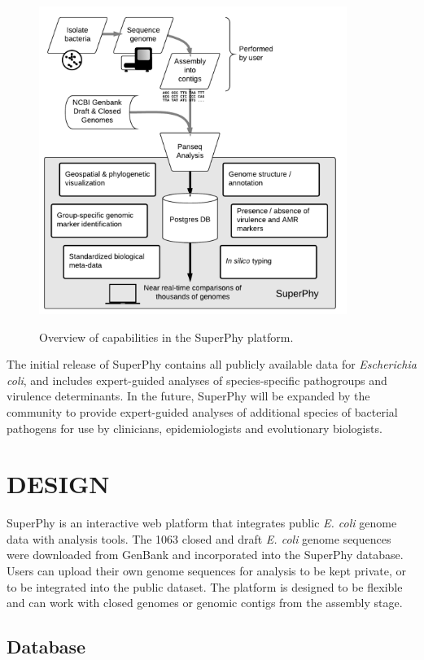 \documentclass[a4paper,twoside]{article}
\begin{document}
\begin{figure}[t]
  \centering
   {\includegraphics[width=10cm]{capabilities.pdf}}
  \caption{Overview of capabilities in the SuperPhy platform.}
  \label{fig:capabilities}
\end{figure}

The initial release of SuperPhy contains all publicly available data for \textit{Escherichia coli}, and includes expert-guided analyses of species-specific pathogroups and virulence determinants. In the future, SuperPhy will be expanded by the community to provide expert-guided analyses of additional species of bacterial pathogens for use by clinicians, epidemiologists and evolutionary biologists.

\section{\uppercase{Design}}
\label{sec:design}

\noindent SuperPhy is an interactive web platform that integrates public \textit{E. coli} genome data with analysis tools. The 1063 closed and draft \textit{E. coli} genome sequences were downloaded from GenBank and incorporated into the SuperPhy database. Users can upload their own genome sequences for analysis to be kept private, or to be integrated into the public dataset. The platform is designed to be flexible and can work with closed genomes or genomic contigs from the assembly stage. 

\subsection{Database}
\end{document}
